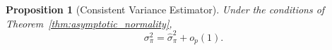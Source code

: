 \documentclass[12pt]{article}
\newcommand{\0}{\boldsymbol{0}}
\newtheorem{theorem}{Theorem}
\newtheorem{prop}{Proposition}
\begin{document}
\begin{prop}[Consistent Variance Estimator] \label{prop:var}
Under the conditions of Theorem~\ref{thm:asymptotic_normality}, $$\sigma_\pi^2= \widehat\sigma_\pi^2+o_p(1).$$
\end{prop}







\end{document}
